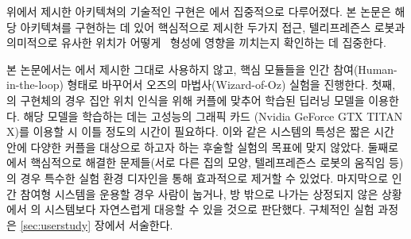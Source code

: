 위에서 제시한 아키텍쳐의 기술적인 구현은 \cite{kang2018homemeld}에서 집중적으로 다루어졌다. 본 논문은 해당 아키텍쳐를 구현하는 데 있어 핵심적으로 제시한 두가지 접근, 텔리프레즌스 로봇과 의미적으로 유사한 위치가 어떻게 \concept\ 형성에 영향을 끼치는지 확인하는 데 집중한다.

본 논문에서는 \cite{kang2018homemeld}에서 제시한 \sysname\을 그대로 사용하지 않고, 핵심 모듈들을 인간 참여(Human-in-the-loop) 형태로 바꾸어서 오즈의 마법사(Wizard-of-Oz) 실험을 진행한다. 첫째, \cite{kang2018homemeld}의 구현체의 경우 집안 위치 인식을 위해 커플에 맞추어 학습된 딥러닝 모델을 이용한다. 해당 모델을 학습하는 데는 고성능의 그래픽 카드 (Nvidia GeForce GTX TITAN X)를 이용할 시 이틀 정도의 시간이 필요하다. 이와 같은 시스템의 특성은 짧은 시간 안에 다양한 커플을 대상으로 하고자 하는 후술할 실험의 목표에 맞지 않았다. 둘째로 \cite{kang2018homemeld}에서 핵심적으로 해결한 문제들(서로 다른 집의 모양, 텔레프레즌스 로봇의 움직임 등)의 경우 특수한 실험 환경 디자인을 통해 효과적으로 제거할 수 있었다. 마지막으로 인간 참여형 시스템을 운용할 경우 사람이 눕거나, 방 밖으로 나가는 상정되지 않은 상황에서 \cite{kang2018homemeld}의 시스템보다 자연스럽게 대응할 수 있을 것으로 판단했다. 구체적인 실험 과정은 \ref{sec:userstudy} 장에서 서술한다.


